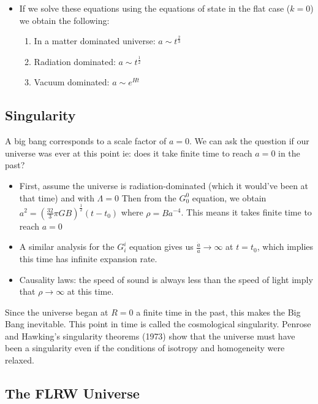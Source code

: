 \documentclass[11pt]{article}
\begin{document}
\begin{itemize}
    \[ 
        G_{{ii}} \to 3\left(\frac{\ddot{a}}{a}\right) = -4 \pi G(\rho + 3p) 
    \]
    This is the acceleration equation. 

    \item If we solve these equations using the equations of state in the flat case (\( k = 0 \)) we obtain the following:
    \begin{enumerate}[label = \roman*]
        \item In a matter dominated universe: \( a \sim t^{\frac{2}{3}} \)
        \item Radiation dominated: \( a \sim t^{\frac{1}{2}} \)
        \item Vacuum dominated: \( a \sim e^{Ht} \)
    \end{enumerate}

\end{itemize}

\subsection{Singularity}
A big bang corresponds to a scale factor of \( a = 0 \). We can ask the question if our universe was ever at this point ie: 
does it take finite time to reach \( a = 0 \) in the past?
\begin{itemize}
    \item First, assume the universe is radiation-dominated (which it would've been at that time) and with \( \Lambda = 0 \)
    Then from the \( G^{0}_{0} \) equation, we obtain \( a^{2} = \left(\frac{32}{3}\pi G B\right)^{\frac{1}{2}}(t - t_{0}) \)
    where \( \rho = Ba^{-4} \). This means it takes finite time to reach \( a=0 \)
    \item A similar analysis for the \( G^{i}_{i} \) equation gives us \( \frac{\dot{a}}{a} \to \infty \) at \( t = t_{0} \),
    which implies this time has infinite expansion rate.
    \item Causality laws: the speed of sound is always less than the speed of light imply that \( \rho \to \infty \) at this time.
\end{itemize}
Since the universe began at \( R = 0 \) a finite time in the past, this makes the Big Bang inevitable. This point in time is called
the cosmological singularity. Penrose and Hawking's singularity theorems (1973) show that the universe must have been a singularity
even if the conditions of isotropy and homogeneity were relaxed.


\subsection{The FLRW Universe}
\end{document}
